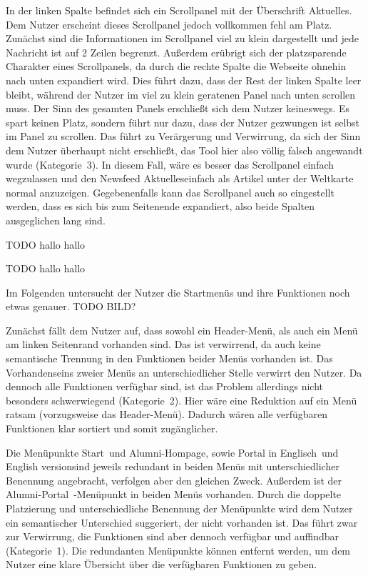 {In der linken Spalte befindet sich ein Scrollpanel mit der Überschrift \glqq Aktuelles\grqq. Dem Nutzer erscheint dieses Scrollpanel jedoch vollkommen fehl am Platz.
Zunächst sind die Informationen im Scrollpanel viel zu klein dargestellt und jede Nachricht ist auf 2 Zeilen begrenzt. Außerdem erübrigt sich der platzsparende Charakter eines Scrollpanels, da durch die rechte Spalte die Webseite ohnehin nach unten expandiert wird. 
Dies führt dazu, dass der Rest der linken Spalte leer bleibt, während der Nutzer im viel zu klein geratenen Panel nach unten scrollen muss.
}{
Der Sinn des gesamten Panels erschließt sich dem Nutzer keineswegs. Es spart keinen Platz, sondern führt nur dazu, dass der Nutzer gezwungen ist selbst im Panel zu scrollen. Das führt zu Verärgerung und Verwirrung, da sich der Sinn dem Nutzer überhaupt nicht erschließt, das Tool hier also völlig falsch angewandt wurde (Kategorie~3).
}{
In diesem Fall, wäre es besser das Scrollpanel einfach wegzulassen und den Newsfeed \glqq Aktuelles\grqq einfach als Artikel unter der Weltkarte normal anzuzeigen. Gegebenenfalls kann das Scrollpanel auch so eingestellt werden, dass es sich bis zum Seitenende expandiert, also beide Spalten ausgeglichen lang sind. 
}

{TODO
}
{hallo
}
{hallo
}

{TODO
}
{hallo	
}
{hallo
}


Im Folgenden untersucht der Nutzer die Startmenüs und ihre Funktionen noch etwas genauer. TODO BILD?

{Zunächst fällt dem Nutzer auf, dass sowohl ein Header-Menü, als auch ein Menü am linken Seitenrand vorhanden sind. Das ist verwirrend, da auch keine semantische Trennung in den Funktionen beider Menüs vorhanden ist. 
}{Das Vorhandenseins zweier Menüs an unterschiedlicher Stelle verwirrt den Nutzer. Da dennoch alle Funktionen verfügbar sind, ist das Problem allerdings nicht besonders schwerwiegend (Kategorie~2).
}{Hier wäre eine Reduktion auf ein Menü ratsam (vorzugsweise das Header-Menü). Dadurch wären alle verfügbaren Funktionen klar sortiert und somit zugänglicher. 
}

{Die Menüpunkte \glqq Start\grqq~und \glqq Alumni-Hompage\grqq, sowie \glqq Portal in Englisch\grqq~und \glqq English version\grqq sind jeweils redundant in beiden Menüs mit unterschiedlicher Benennung angebracht, verfolgen aber den gleichen Zweck. Außerdem ist der \glqq Alumni-Portal\grqq~-Menüpunkt in beiden Menüs vorhanden.
}
{Durch die doppelte Platzierung und unterschiedliche Benennung der Menüpunkte wird dem Nutzer ein semantischer Unterschied suggeriert, der nicht vorhanden ist. Das führt zwar zur Verwirrung, die Funktionen sind aber dennoch verfügbar und auffindbar (Kategorie~1).
}
{Die redundanten Menüpunkte können entfernt werden, um dem Nutzer eine klare Übersicht über die verfügbaren Funktionen zu geben. 
}

